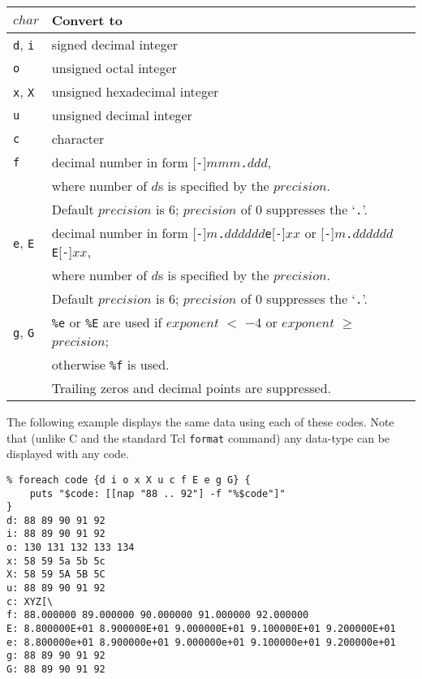 \begin{itemize}
    \begin{tabular}{|l|l|}
      \hline 
          $char$ & \textbf{Convert to}
      \\
        \hline 
        \hline 
          \texttt{d}, \texttt{i} & signed decimal integer
        \\
        \hline 
          \texttt{o} & unsigned octal integer
        \\
        \hline 
          \texttt{x}, \texttt{X} & unsigned hexadecimal integer
        \\
        \hline 
          \texttt{u} & unsigned decimal integer
        \\
        \hline 
          \texttt{c} & character
        \\
        \hline 
          \texttt{f} & decimal number in form [\texttt{-}]$mmm$\texttt{.}$ddd$,
	\\
	& where number of $d$s is specified by the $precision$.
        \\
	  & Default $precision$ is 6; $precision$ of 0 suppresses the `\texttt{.}'.
        \\
        \hline 
          \texttt{e}, \texttt{E}
	  & decimal number in form [\texttt{-}]$m$\texttt{.}$dddddd$\texttt{e}[\texttt{-}]$xx$
	  or [\texttt{-}]$m$\texttt{.}$dddddd$\texttt{E}[\texttt{-}]$xx$,
	  \\
	  & where number of $d$s is specified by the $precision$.  
	  \\
	  & Default $precision$ is 6; $precision$ of 0 suppresses the `\texttt{.}'.
        \\
        \hline 
          \texttt{g}, \texttt{G} & \texttt{\%e} or \texttt{\%E} are used if $exponent$ $<$ $-$4 or $exponent$ $\ge$ $precision$;
	  \\
	  & otherwise \texttt{\%f} is used.
	  \\
	  & Trailing zeros and decimal points are suppressed.
        \\
    \hline
\end{tabular}

  \end{itemize}
  

The following example displays the same data using each of these
  codes. Note that (unlike C and the standard Tcl 
  \texttt{format} command) any data-type can be displayed with any
  code.
  \begin{verbatim}
% foreach code {d i o x X u c f E e g G} {
    puts "$code: [[nap "88 .. 92"] -f "%$code"]"
}
d: 88 89 90 91 92
i: 88 89 90 91 92
o: 130 131 132 133 134
x: 58 59 5a 5b 5c
X: 58 59 5A 5B 5C
u: 88 89 90 91 92
c: XYZ[\
f: 88.000000 89.000000 90.000000 91.000000 92.000000
E: 8.800000E+01 8.900000E+01 9.000000E+01 9.100000E+01 9.200000E+01
e: 8.800000e+01 8.900000e+01 9.000000e+01 9.100000e+01 9.200000e+01
g: 88 89 90 91 92
G: 88 89 90 91 92
\end{verbatim}

